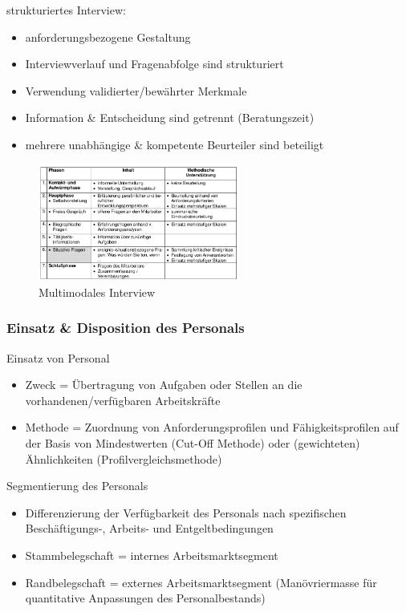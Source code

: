 \documentclass[11pt]{article}
\begin{document}
strukturiertes Interview:
\begin{itemize}
\item anforderungsbezogene Gestaltung
\item Interviewverlauf und Fragenabfolge sind strukturiert
\item Verwendung validierter/bewährter Merkmale
\item Information \& Entscheidung sind getrennt (Beratungszeit)
\item mehrere unabhängige \& kompetente Beurteiler sind beteiligt
\end{itemize}


\begin{figure}[htbp]
\centering
\includegraphics[width=250px]{./pictures/persint.png}
\caption{Multimodales Interview}
\end{figure} 
\subsubsection{Einsatz \& Disposition des Personals}
\label{sec:orgc04aacb}
Einsatz von Personal
\begin{itemize}
\item Zweck =  Übertragung von Aufgaben oder Stellen an die vorhandenen/verfügbaren Arbeitskräfte
\item Methode = Zuordnung von Anforderungsprofilen und Fähigkeitsprofilen auf der Basis von Mindestwerten (Cut-Off Methode) oder (gewichteten) Ähnlichkeiten (Profilvergleichsmethode)
\end{itemize}

Segmentierung des Personals
\begin{itemize}
\item Differenzierung der Verfügbarkeit des Personals nach spezifischen Beschäftigungs-, Arbeits- und Entgeltbedingungen
\item Stammbelegschaft = internes Arbeitsmarktsegment
\item Randbelegschaft = externes Arbeitsmarktsegment (Manövriermasse für quantitative Anpassungen des Personalbestands)
\end{itemize}
\end{document}

